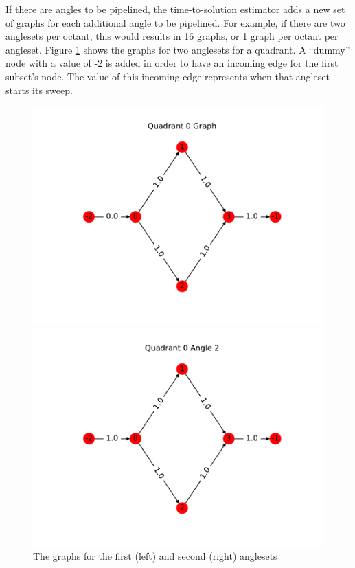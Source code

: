 If there are angles to be pipelined, the time-to-solution estimator adds a new set of graphs for each additional angle to be pipelined. For example, if there are two anglesets per octant, this would results in 16 graphs, or 1 graph per octant per angleset. Figure \ref{angular_pipeline} shows the graphs for two anglesets for a quadrant. A ``dummy'' node with a value of -2 is added in order to have an incoming edge for the first subset's node. The value of this incoming edge represents when that angleset starts its sweep. 
\begin{figure}[H]
\begin{minipage}[c]{0.5\textwidth}
\centering
\includegraphics[scale=0.6]{../../figures/q0_postpipeline.pdf}
\end{minipage}
\begin{minipage}[c]{0.5\textwidth}
\centering
\includegraphics[scale=0.6]{../../figures/q4_postpipeline.pdf}
\end{minipage}
\caption{The graphs for the first (left) and second (right) anglesets}
\label{angular_pipeline}
\end{figure}

